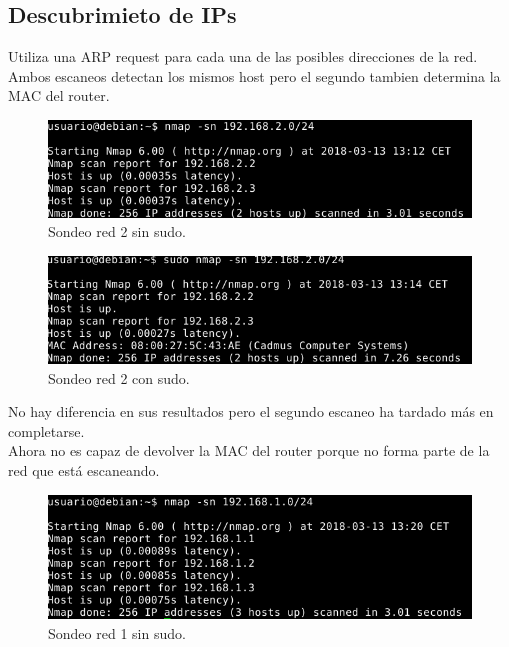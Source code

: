 \documentclass[11pt]{article}
\begin{document}
    \subsection{Descubrimieto de IPs}
      \par
      Utiliza una ARP request para cada una de las posibles direcciones de la red.\\
      Ambos escaneos detectan los mismos host pero el segundo tambien determina la MAC del router.

      \begin{figure}[H]
        \centering
        \includegraphics[width = \textwidth]{sondeo1}
        \caption{Sondeo red 2 sin sudo.}
      \end{figure}

      \begin{figure}[H]
        \centering
        \includegraphics[width = \textwidth]{sondeo2}
        \caption{Sondeo red 2 con sudo.}
      \end{figure}

      \par
      No hay diferencia en sus resultados pero el segundo escaneo ha tardado más en completarse.\\
      Ahora no es capaz de devolver la MAC del router porque no forma parte de la red que está
      escaneando.

      \begin{figure}[H]
        \centering
        \includegraphics[width = \textwidth]{sondeo3}
        \caption{Sondeo red 1 sin sudo.}
      \end{figure}
\end{document}
